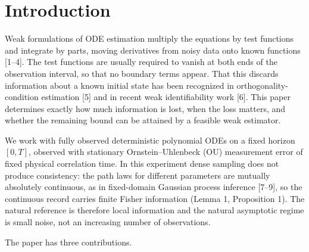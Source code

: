 \documentclass[ejs]{imsart}
\begin{document}
\section{Introduction}\label{introduction}

Weak formulations of ODE estimation multiply the equations by test
functions and integrate by parts, moving derivatives from noisy data
onto known functions {[}1--4{]}. The test functions are usually required
to vanish at both ends of the observation interval, so that no boundary
terms appear. That this discards information about a known initial state
has been recognized in orthogonality-condition estimation {[}5{]} and in
recent weak identifiability work {[}6{]}. This paper determines exactly
how much information is lost, when the loss matters, and whether the
remaining bound can be attained by a feasible weak estimator.

We work with fully observed deterministic polynomial ODEs on a fixed
horizon \([0,T]\), observed with stationary Ornstein--Uhlenbeck (OU)
measurement error of fixed physical correlation time. In this experiment
dense sampling does not produce consistency: the path laws for different
parameters are mutually absolutely continuous, as in fixed-domain
Gaussian process inference {[}7--9{]}, so the continuous record carries
finite Fisher information (Lemma 1, Proposition 1). The natural
reference is therefore local information and the natural asymptotic
regime is small noise, not an increasing number of observations.

The paper has three contributions.
\end{document}
